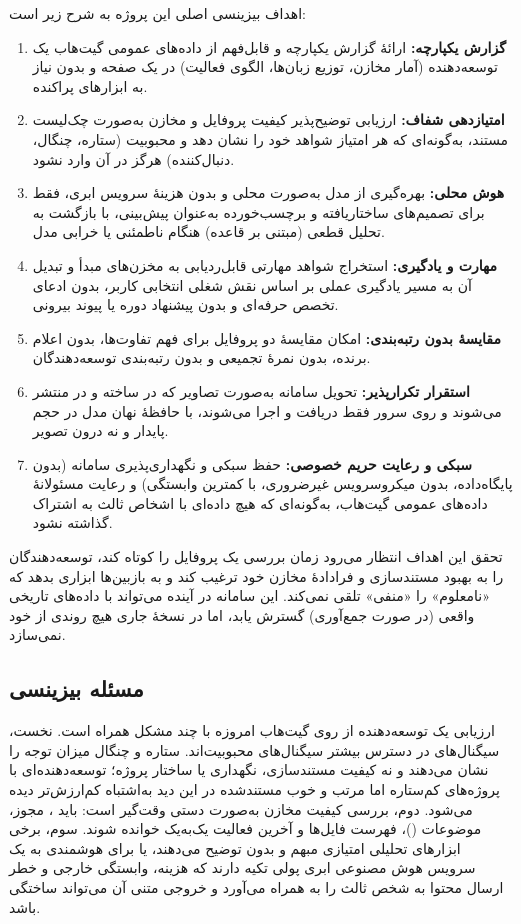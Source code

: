 \documentclass[12pt]{article}
\begin{document}
 اهداف بیزینسی اصلی این پروژه به شرح زیر است:

 \begin{enumerate}
\item \textbf{گزارش یکپارچه:} ارائهٔ گزارش یکپارچه و قابل‌فهم از داده‌های عمومی گیت‌هاب یک توسعه‌دهنده (آمار مخازن، توزیع زبان‌ها، الگوی فعالیت) در یک صفحه و بدون نیاز به ابزارهای پراکنده.
\item \textbf{امتیازدهی شفاف:} ارزیابی توضیح‌پذیر کیفیت پروفایل و مخازن به‌صورت چک‌لیست مستند، به‌گونه‌ای که هر امتیاز شواهد خود را نشان دهد و محبوبیت (ستاره، چنگال، دنبال‌کننده) هرگز در آن وارد نشود.
\item \textbf{هوش محلی:} بهره‌گیری از مدل  به‌صورت محلی و بدون هزینهٔ سرویس ابری، فقط برای تصمیم‌های ساختاریافته و برچسب‌خورده به‌عنوان پیش‌بینی، با بازگشت به تحلیل قطعی (مبتنی بر قاعده) هنگام ناطمئنی یا خرابی مدل.
\item \textbf{مهارت و یادگیری:} استخراج شواهد مهارتی قابل‌ردیابی به مخزن‌های مبدأ و تبدیل آن به مسیر یادگیری عملی بر اساس نقش شغلی انتخابی کاربر، بدون ادعای تخصص حرفه‌ای و بدون پیشنهاد دوره یا پیوند بیرونی.
\item \textbf{مقایسهٔ بدون رتبه‌بندی:} امکان مقایسهٔ دو پروفایل برای فهم تفاوت‌ها، بدون اعلام برنده، بدون نمرهٔ تجمیعی و بدون رتبه‌بندی توسعه‌دهندگان.
\item \textbf{استقرار تکرارپذیر:} تحویل سامانه به‌صورت تصاویر  که در  ساخته و در  منتشر می‌شوند و روی سرور فقط دریافت و اجرا می‌شوند، با حافظهٔ نهان مدل در حجم پایدار و نه درون تصویر.
\item \textbf{سبکی و رعایت حریم خصوصی:} حفظ سبکی و نگهداری‌پذیری سامانه (بدون پایگاه‌داده، بدون میکروسرویس غیرضروری، با کمترین وابستگی) و رعایت مسئولانهٔ داده‌های عمومی گیت‌هاب، به‌گونه‌ای که هیچ داده‌ای با اشخاص ثالث به اشتراک گذاشته نشود.
\end{enumerate}
 تحقق این اهداف انتظار می‌رود زمان بررسی یک پروفایل را کوتاه کند، توسعه‌دهندگان را به بهبود مستندسازی و فرادادهٔ مخازن خود ترغیب کند و به بازبین‌ها ابزاری بدهد که «نامعلوم» را «منفی» تلقی نمی‌کند. این سامانه در آینده می‌تواند با داده‌های تاریخی واقعی (در صورت جمع‌آوری) گسترش یابد، اما در نسخهٔ جاری هیچ روندی از خود نمی‌سازد.
\subsection{مسئله بیزینسی}
 ارزیابی یک توسعه‌دهنده از روی گیت‌هاب امروزه با چند مشکل همراه است. نخست، سیگنال‌های در دسترس بیشتر سیگنال‌های محبوبیت‌اند. ستاره و چنگال میزان توجه را نشان می‌دهند و نه کیفیت مستندسازی، نگهداری یا ساختار پروژه؛ توسعه‌دهنده‌ای با پروژه‌های کم‌ستاره اما مرتب و خوب مستندشده در این دید به‌اشتباه کم‌ارزش‌تر دیده می‌شود. دوم، بررسی کیفیت مخازن به‌صورت دستی وقت‌گیر است: باید ، مجوز، موضوعات ()، فهرست فایل‌ها و آخرین فعالیت یک‌به‌یک خوانده شوند. سوم، برخی ابزارهای تحلیلی امتیازی مبهم و بدون توضیح می‌دهند، یا برای هوشمندی به یک سرویس هوش مصنوعی ابری پولی تکیه دارند که هزینه، وابستگی خارجی و خطر ارسال محتوا به شخص ثالث را به همراه می‌آورد و خروجی متنی آن می‌تواند ساختگی باشد.
\end{document}
